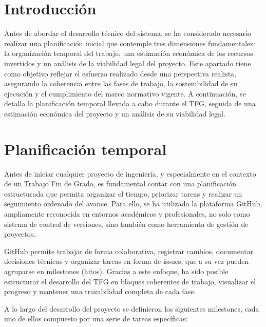 
\section{Introducción}

Antes de abordar el desarrollo técnico del sistema, se ha considerado necesario realizar una planificación inicial que contemple tres dimensiones fundamentales: la organización temporal del trabajo, una estimación económica de los recursos invertidos y un análisis de la viabilidad legal del proyecto.
Este apartado tiene como objetivo reflejar el esfuerzo realizado desde una perspectiva realista, asegurando la coherencia entre las fases de trabajo, la sostenibilidad de su ejecución y el cumplimiento del marco normativo vigente.
A continuación, se detalla la planificación temporal llevada a cabo durante el TFG, seguida de una estimación económica del proyecto y un análisis de su viabilidad legal.



\section{Planificación temporal}
Antes de iniciar cualquier proyecto de ingeniería, y especialmente en el contexto de un Trabajo Fin de Grado, es fundamental contar con una planificación estructurada que permita organizar el tiempo, priorizar tareas y realizar un seguimiento ordenado del avance. Para ello, se ha utilizado la plataforma GitHub, ampliamente reconocida en entornos académicos y profesionales, no solo como sistema de control de versiones, sino también como herramienta de gestión de proyectos.

GitHub permite trabajar de forma colaborativa, registrar cambios, documentar decisiones técnicas y organizar tareas en forma de issues, que a su vez pueden agruparse en milestones (hitos). Gracias a este enfoque, ha sido posible estructurar el desarrollo del TFG en bloques coherentes de trabajo, visualizar el progreso y mantener una trazabilidad completa de cada fase.

A lo largo del desarrollo del proyecto se definieron los siguientes milestones, cada uno de ellos compuesto por una serie de tareas específicas:

